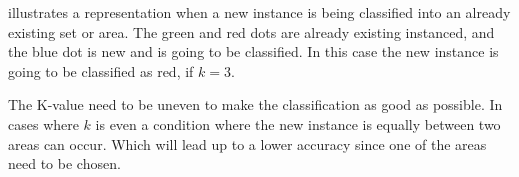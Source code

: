 \bigskip

 illustrates a representation when a new instance is being classified into an already existing set or area.
The green and red dots are already existing instanced, and the blue dot is new and is going to be classified.
In this case the new instance is going to be classified as red, if $k=3$.


\bigskip

The K-value need to be uneven to make the classification as good as possible. 
In cases where $k$ is even a condition where the new instance is equally between two areas can occur.
Which will lead up to a lower accuracy since one of the areas need to be chosen.



